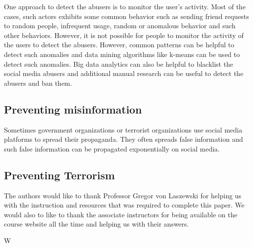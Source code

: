 \documentclass[sigconf]{acmart}
\begin{document}
One approach to detect the abusers is to monitor the user's activity. Most of the cases, such actors exhibits some common behavior such as sending friend requests to random people, infrequent usage, random or anomalous behavior and such other behaviors. However, it is not possible for people to monitor the activity of the users to detect the abusers. However, common patterns can be helpful to detect such anomalies and data mining algorithms like k-means can be used to detect such anomalies. Big data analytics can also be helpful to blacklist the social media abusers and additional manual research can be useful to detect the abusers and ban them. 


\subsection{Preventing misinformation}
Sometimes government organizations or terrorist organizations use social media platforms to spread their propaganda. They often spreads false information and such false information can be propagated exponentially on social media. 
\subsection{Preventing Terrorism}




\begin{acks}

The authors would like to thank Professor Gregor von Laszewski for helping us with the instruction and resources that was required to complete this paper. We would also to like to thank the associate instructors for being available on the course website all the time and helping us with their answers.

\end{acks}


 
\newpage
\appendix


W%


\end{document}
